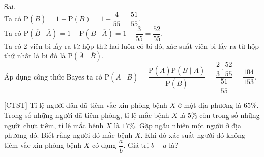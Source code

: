 \begin{ex}
{\begin{itemchoice}
			\itemch Sai.\\
			Ta có $\mathrm{P}(\overline{B})=1-\mathrm{P}(B)=1-\dfrac{4}{55}=\dfrac{51}{55}$.\\
			Ta có $\mathrm{P}(\overline{B} \mid \overline{A}) = 1-\mathrm{P}(B \mid \overline{A}) = 1-\dfrac{3}{55}=\dfrac{52}{55}$.\\
			Ta có $2$ viên bi lấy ra từ hộp thứ hai luôn có bi đỏ, xác suất viên bi lấy ra từ hộp thứ nhất là bi đỏ là $\mathrm{P}(\overline{A}\mid \overline{B})$.\\
			Áp dụng công thức Bayes ta có
			$\mathrm{P}(\overline{A}\mid \overline{B}) =\dfrac{\mathrm{P}(\overline{A}) \mathrm{P}(\overline{B} \mid \overline{A})}{\mathrm{P}(\overline{B})} = \dfrac{\dfrac{2}{3} \cdot \dfrac{52}{55}}{ \dfrac{51}{55}} = \dfrac{104}{153}$.
		\end{itemchoice}
	}
\end{ex}

\begin{bt}%
[CTST]%
	Tỉ lệ người dân đã tiêm vắc xin phòng bệnh $X$ ở một địa phương là $65\%$. Trong số những 
	người đã tiêm phòng, tỉ lệ mắc bệnh $X$ là $5\%$ còn trong số những người chưa tiêm, tỉ lệ 
	mắc bệnh $X$ là $17\%$. Gặp ngẫu nhiên một người ở địa phương đó. Biết rằng người đó mắc bệnh $X$. Khi đó xác suất người đó không tiêm vắc xin phòng bệnh $X$ có dạng $\dfrac{a}{b}$. Giá trị $b-a$ là?
\end{bt}

